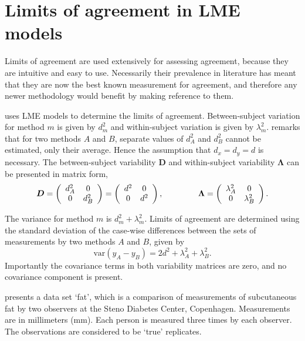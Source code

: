 \documentclass[12pt, a4paper]{report}
\theoremstyle{plain}
\theoremstyle{definition}
\theoremstyle{remark}
\begin{document}
\section{Limits of agreement in LME models}

Limits of agreement are used extensively for assessing agreement, because they are intuitive and easy to use.
Necessarily their prevalence in literature has meant that they are now the best known measurement for agreement, and therefore any newer methodology would benefit by making reference to them.

\citet{BXC2008} uses LME models to determine the limits of agreement. Between-subject variation for method $m$ is given by $d^2_{m}$ and within-subject variation is given by $\lambda^2_{m}$.  \citet{BXC2008} remarks that for two methods $A$ and $B$, separate values of $d^2_{A}$ and $d^2_{B}$ cannot be estimated, only their average. Hence the assumption that $d_{x}= d_{y}= d$ is necessary. The between-subject variability $\boldsymbol{D}$ and within-subject variability $\boldsymbol{\Lambda}$ can be presented in matrix form,\[
\boldsymbol{D} = \left(%
\begin{array}{cc}
d^2_{A}& 0 \\
0 & d^2_{B} \\
\end{array}%
\right)=\left(%
\begin{array}{cc}
d^2& 0 \\
0 & d^2\\
\end{array}%
\right),
\hspace{1.5cm}
\boldsymbol{\Lambda} = \left(%
\begin{array}{cc}
\lambda^2_{A}& 0 \\
0 & \lambda^2_{B} \\
\end{array}%
\right).
\]

The variance for method $m$ is $d^2_{m}+\lambda^2_{m}$. Limits of agreement are determined using the standard deviation of the case-wise differences between the sets of measurements by two methods $A$ and $B$, given by
\begin{equation}
\mbox{var} (y_{A}-y_{B}) = 2d^2 + \lambda^2_{A}+ \lambda^2_{B}.
\end{equation}
Importantly the covariance terms in both variability matrices are zero, and no covariance component is present.

\citet{BXC2008} presents a data set `fat', which is a comparison of measurements of subcutaneous fat
by two observers at the Steno Diabetes Center, Copenhagen. Measurements are in millimeters
(mm). Each person is measured three times by each observer. The observations are considered to be `true' replicates.
\end{document}
